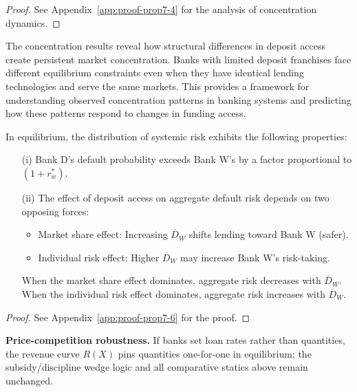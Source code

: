 \documentclass[12pt]{article}
\begin{document}
\begin{proof}
See Appendix~\ref{app:proof-prop7-4} for the analysis of concentration dynamics.
\end{proof}

\begin{remark}
The concentration results reveal how structural differences in deposit access create persistent market concentration. Banks with limited deposit franchises face different equilibrium constraints even when they have identical lending technologies and serve the same markets. This provides a framework for understanding observed concentration patterns in banking systems and predicting how these patterns respond to changes in funding access.
\end{remark}

\begin{proposition}\label{prop:risk-distribution}
In equilibrium, the distribution of systemic risk exhibits the following properties:
\begin{enumerate}
    \item[(i)] Bank D's default probability exceeds Bank W's by a factor proportional to $(1+r_{w}^{*})$.
    \item[(ii)] The effect of deposit access on aggregate default risk depends on two opposing forces:
    \begin{itemize}
        \item Market share effect: Increasing $\overline{D}_{W}$ shifts lending toward Bank W (safer).
        \item Individual risk effect: Higher $\overline{D}_{W}$ may increase Bank W's risk-taking.
    \end{itemize}
    When the market share effect dominates, aggregate risk decreases with $\overline{D}_{W}$. When the individual risk effect dominates, aggregate risk increases with $\overline{D}_{W}$.
\end{enumerate}
\end{proposition}

\begin{proof}
See Appendix~\ref{app:proof-prop7-6} for the proof.
\end{proof}

\noindent\textbf{Price-competition robustness.} If banks set loan rates rather than quantities, the revenue curve $R(X)$ pins quantities one-for-one in equilibrium; the subsidy/discipline wedge logic and all comparative statics above remain unchanged.
\end{document}
